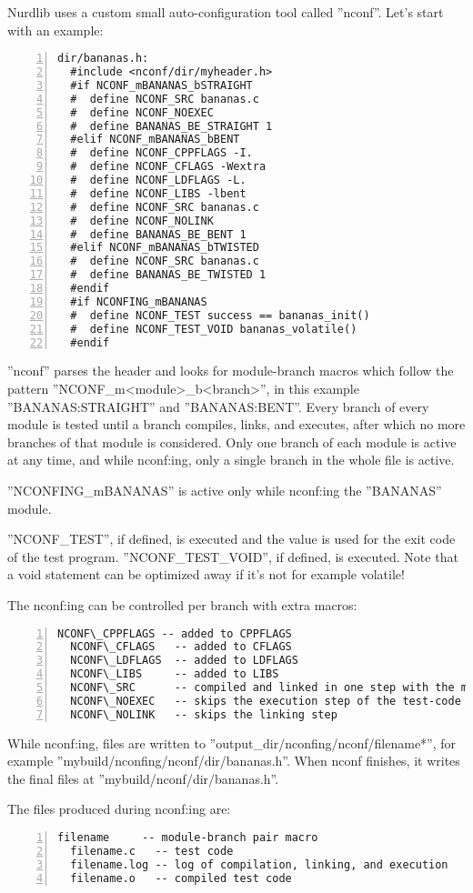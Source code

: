 \documentclass{article}
\begin{document}
Nurdlib uses a custom small auto-configuration tool called ''nconf''. Let's
start with an example:
\begin{Verbatim}[frame=single,numbers=left]
dir/bananas.h:
  #include <nconf/dir/myheader.h>
  #if NCONF_mBANANAS_bSTRAIGHT
  #  define NCONF_SRC bananas.c
  #  define NCONF_NOEXEC
  #  define BANANAS_BE_STRAIGHT 1
  #elif NCONF_mBANANAS_bBENT
  #  define NCONF_CPPFLAGS -I.
  #  define NCONF_CFLAGS -Wextra
  #  define NCONF_LDFLAGS -L.
  #  define NCONF_LIBS -lbent
  #  define NCONF_SRC bananas.c
  #  define NCONF_NOLINK
  #  define BANANAS_BE_BENT 1
  #elif NCONF_mBANANAS_bTWISTED
  #  define NCONF_SRC bananas.c
  #  define BANANAS_BE_TWISTED 1
  #endif
  #if NCONFING_mBANANAS
  #  define NCONF_TEST success == bananas_init()
  #  define NCONF_TEST_VOID bananas_volatile()
  #endif
\end{Verbatim}
''nconf'' parses the header and looks for module-branch macros which follow
the pattern ''NCONF\_m<module>\_b<branch>'', in this example
''BANANAS:STRAIGHT'' and ''BANANAS:BENT''. Every branch of every module is
tested until a branch compiles, links, and executes, after which no more
branches of that module is considered. Only one branch of each module is
active at any time, and while nconf:ing, only a single branch in the whole
file is active.

''NCONFING\_mBANANAS'' is active only while nconf:ing the ''BANANAS'' module.

''NCONF\_TEST'', if defined, is executed and the value is used for the exit
code of the test program. ''NCONF\_TEST\_VOID'', if defined, is executed. Note
that a void statement can be optimized away if it's not for example volatile!

The nconf:ing can be controlled per branch with extra macros:
\begin{Verbatim}[frame=single,numbers=left]
  NCONF\_CPPFLAGS -- added to CPPFLAGS
  NCONF\_CFLAGS   -- added to CFLAGS
  NCONF\_LDFLAGS  -- added to LDFLAGS
  NCONF\_LIBS     -- added to LIBS
  NCONF\_SRC      -- compiled and linked in one step with the main object
  NCONF\_NOEXEC   -- skips the execution step of the test-code
  NCONF\_NOLINK   -- skips the linking step
\end{Verbatim}

While nconf:ing, files are written to ''output\_dir/nconfing/nconf/filename*'',
for example ''mybuild/nconfing/nconf/dir/bananas.h''. When nconf finishes, it
writes the final files at ''mybuild/nconf/dir/bananas.h''.

The files produced during nconf:ing are:
\begin{Verbatim}[frame=single,numbers=left]
  filename     -- module-branch pair macro
  filename.c   -- test code
  filename.log -- log of compilation, linking, and execution
  filename.o   -- compiled test code
\end{Verbatim}
\end{document}
